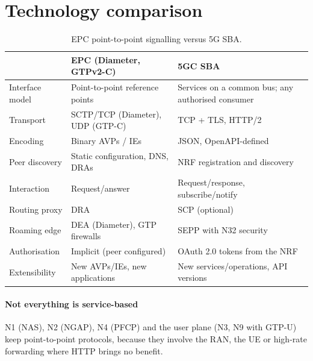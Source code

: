 \documentclass[11pt,a4paper]{article}
\begin{document}
\section{Technology comparison}
\begin{table}[htbp]
\centering\small
\caption{EPC point-to-point signalling versus 5G SBA.}\label{tab:cmp}
\begin{tabularx}{\linewidth}{@{}l Y Y@{}}
\toprule
{} & EPC (Diameter, GTPv2-C) & 5GC SBA \\
\midrule
Interface model   & Point-to-point reference points & Services on a common bus; any authorised consumer \\
Transport         & SCTP/TCP (Diameter), UDP (GTP-C) & TCP + TLS, HTTP/2 \\
Encoding          & Binary AVPs / IEs               & JSON, OpenAPI-defined \\
Peer discovery    & Static configuration, DNS, DRAs  & NRF registration and discovery \\
Interaction       & Request/answer                  & Request/response, subscribe/notify \\
Routing proxy     & DRA                             & SCP (optional) \\
Roaming edge      & DEA (Diameter), GTP firewalls   & SEPP with N32 security \\
Authorisation     & Implicit (peer configured)      & OAuth 2.0 tokens from the NRF \\
Extensibility     & New AVPs/IEs, new applications  & New services/operations, API versions \\
\bottomrule
\end{tabularx}
\end{table}

\paragraph{Not everything is service-based} N1 (NAS), N2 (NGAP), N4 (PFCP) and the user plane (N3, N9 with GTP-U) keep
point-to-point protocols, because they involve the RAN, the UE or high-rate forwarding where HTTP brings no benefit.

\end{document}
